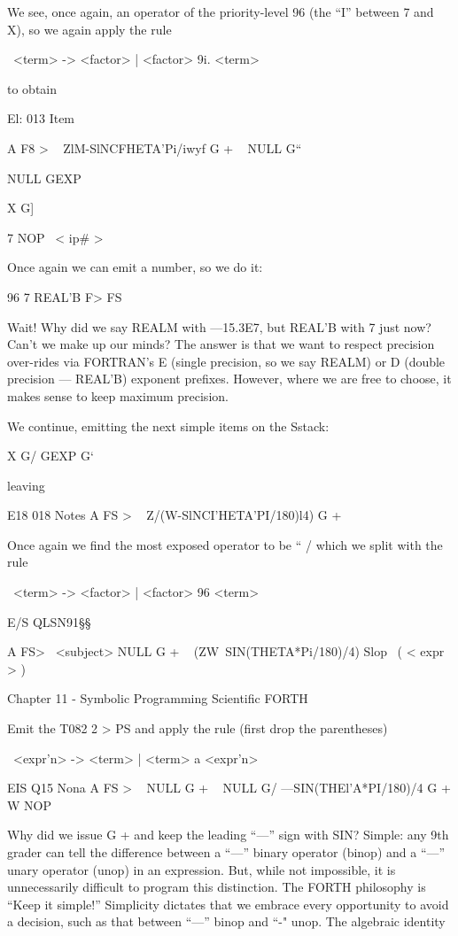 We see, once again, an operator of the priority-level 96 (the “I”
between 7 and X), so we again apply the rule

\ <term> -> <factor> | <factor> 9i. <term>

to obtain

El: 013 Item

A F8 > \ < subject >
ZlM-SlNCFHETA'Pi/iwyf G + \ < term >
NULL G“

NULL GEXP

X G] \ < id >

7 NOP \ < ip\# >

Once again we can emit a number, so we do it:

96 7 REAL'B F> FS

Wait! Why did we say REALM with —15.3E7, but REAL'B with
7 just now? Can’t we make up our minds? The answer is that we
want to respect precision over-rides via FORTRAN's E (single
precision, so we say REALM) or D (double precision — REAL'B)
exponent prefixes. However, where we are free to choose, it
makes sense to keep maximum precision.

We continue, emitting the next simple items on the Sstack:

X G/ GEXP G‘

 

leaving

E18 018 Notes
A FS > \ < subject >
Z/(W-SlNCI’HETA'PI/180)l4) G + \ < term >

Once again we find the most exposed operator to be “ / which
we split with the rule

\ <term> -> <factor> | <factor> 96 <term>

 

E/S QLSN91§§

A FS> \ <subject>
NULL G + \ < term >
(ZW~SIN(THETA*Pi/180)/4) Slop \ ( < expr > )

Chapter 11 - Symbolic Programming Scientific FORTH

Emit the T082
2 > PS
and apply the rule (first drop the parentheses)

\ <expr'n> -> <term> | <term> a <expr'n>

 

EIS Q15 Nona
A FS > \ < subject >
NULL G + \ < term >
NULL G/
—SIN(THEl'A*PI/180)/4 G +
W NOP

Why did we issue G + and keep the leading “—” sign with SIN?
Simple: any 9th grader can tell the difference between a “—”
binary operator (binop) and a “—” unary operator (unop) in an
expression. But, while not impossible, it is unnecessarily difficult
to program this distinction. The FORTH philosophy is “Keep it
simple!” Simplicity dictates that we embrace every opportunity
to avoid a decision, such as that between “—” binop and “-" unop.
The algebraic identity

